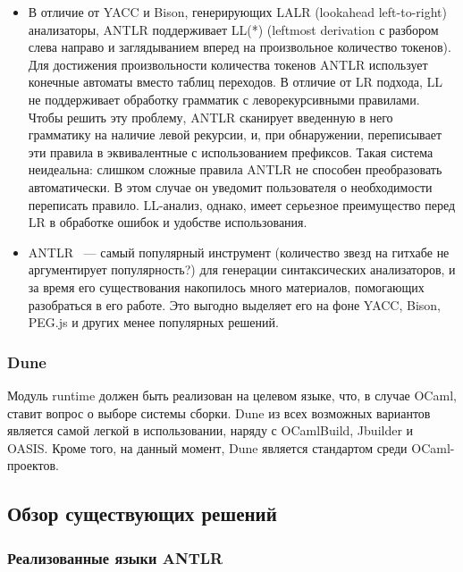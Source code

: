 \begin{itemize}
    \begin{itemize}
        \item В отличие от YACC и Bison, генерирующих LALR (lookahead left-to-right) анализаторы, ANTLR поддерживает LL(*) (leftmost derivation с разбором слева направо и заглядыванием вперед на произвольное количество токенов). 
        Для достижения произвольности количества токенов ANTLR использует конечные автоматы вместо таблиц переходов. 
        В отличие от LR подхода, LL не поддерживает обработку грамматик с леворекурсивными правилами. 
        Чтобы решить эту проблему, ANTLR сканирует введенную в него грамматику на наличие левой рекурсии, и, при обнаружении, переписывает эти правила в эквивалентные с использованием префиксов. 
        Такая система неидеальна: слишком сложные правила ANTLR не способен преобразовать автоматически. 
        В этом случае он уведомит пользователя о необходимости переписать правило. 
        LL-анализ, однако, имеет серьезное преимущество перед LR в обработке ошибок и удобстве использования. 
        \item ANTLR ~--- самый популярный инструмент (количество звезд на гитхабе не аргументирует популярность?) для генерации синтаксических анализаторов, и за время его существования накопилось много материалов, помогающих разобраться в его работе. 
        Это выгодно выделяет его на фоне YACC, Bison, PEG.js и других менее популярных решений.
    \end{itemize}
\end{itemize}

\subsubsection{Dune}

Модуль runtime должен быть реализован на целевом языке, что, в случае OCaml, ставит вопрос о выборе системы сборки. 
Dune из всех возможных вариантов является самой легкой в использовании, наряду с OCamlBuild, Jbuilder и OASIS. 
Кроме того, на данный момент, Dune является стандартом среди OCaml-проектов.

\subsection{Обзор существующих решений}

\subsubsection{Реализованные языки ANTLR}

